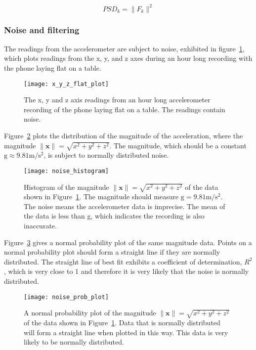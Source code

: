       $$PSD_k = \|F_k\|^2$$
      
    \subsubsection{Noise and filtering}
      The readings from the accelerometer are subject to noise, exhibited in 
      figure~\ref{fig:x_y_z_flat_plot}, which plots readings from the x, y, and z axes during an hour long recording with the phone laying flat on a table.
      
      \begin{figure}
        \centering
        \texttt{[image: x\_y\_z\_flat\_plot]}
        \caption{The x, y and z axis readings from an hour long accelerometer recording of the phone laying flat on a table. The readings contain noise.}
        \label{fig:x_y_z_flat_plot}
      \end{figure}
      
      
      Figure~\ref{fig:noise_histogram} plots the distribution of the magnitude of the acceleration, where the magnitude $\|\mathbf{x}\| = \sqrt{x^2+y^2+z^2}$. The magnitude, which should be a constant $\mathrm{g} \approx 9.81 \si{\meter\per\square\second}$, is subject to normally distributed noise.
      
      \begin{figure}
        \centering
        \texttt{[image: noise\_histogram]}
        \caption{Histogram of the magnitude $\|\mathbf{x}\| = \sqrt{x^2+y^2+z^2}$ of the data shown in Figure~\ref{fig:x_y_z_flat_plot}. The magnitude should measure $ \mathrm{g} = 9.81\si{\metre\per\square\second}$. The noise means the accelerometer data is imprecise. The mean of the data is less than g, which indicates the recording is also inaccurate.}
        \label{fig:noise_histogram}
      \end{figure}
      
      Figure~\ref{fig:noise_prob_plot} gives a normal probability plot of the same magnitude data. Points on a normal probability plot should form a straight line if they are normally distributed. The straight line of best fit exhibits a coefficient of determination, $R^2$, which is very close to 1 and therefore it is very likely that the noise is normally distributed.
      
      \begin{figure}
        \centering
        \texttt{[image: noise\_prob\_plot]}
        \caption{A normal probability plot of the magnitude $\|\mathbf{x}\| = \sqrt{x^2+y^2+z^2}$  of the data shown in Figure~\ref{fig:x_y_z_flat_plot}. Data that is normally distributed will form a straight line when plotted in this way. This data is very likely to be normally distributed.}
        \label{fig:noise_prob_plot}
      \end{figure}
      
